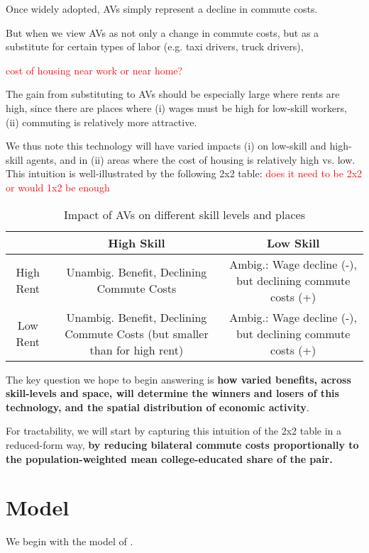 \documentclass{article}
\begin{document}
Once widely adopted, AVs simply represent a decline in commute costs.

But when we view AVs as not only a change in commute costs, but as a substitute for certain types of labor (e.g. taxi drivers, truck drivers),
 
\textcolor{red}{cost of housing near work or near home?}

The gain from substituting to AVs should be especially large where rents are high, since there are places where (i) wages must be high for low-skill workers, (ii) commuting  is relatively more attractive. 


We thus note this technology will have varied impacts (i) on low-skill and high-skill agents, and in (ii) areas where the cost of housing is relatively high vs. low.
This intuition is well-illustrated by the following 2x2 table: \textcolor{red}{does it need to be 2x2 or would 1x2 be enough}
\begin{table}[h!]
\centering
\begin{tabular}{|c|c|c|}
\hline
 & High Skill & Low Skill \\ \hline
High Rent & Unambig. Benefit, Declining Commute Costs & Ambig.:  Wage decline (-), but declining commute costs (+)   \\ \hline
Low Rent & Unambig. Benefit, Declining Commute Costs (but smaller than for high rent) & Ambig.:  Wage decline (-), but declining commute costs (+)   \\ \hline
\end{tabular}
\caption{Impact of AVs on different skill levels and places}
\label{tab:impact_avs}
\end{table}


The key question we hope to begin answering is \textbf{how varied benefits, across skill-levels and space, will determine the winners and losers of this technology, and the spatial distribution of economic activity}.

For tractability, we will start by capturing this intuition of the 2x2 table in a reduced-form way,  \textbf{by reducing bilateral commute costs proportionally to the population-weighted mean college-educated share of the pair. }


\section{Model}

We begin with the model of \citep{monte_commuting_2018}.
\end{document}
